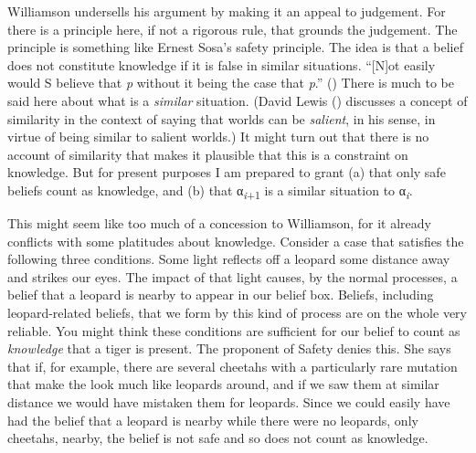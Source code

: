 \documentclass[
  10pt,
  letterpaper,
  DIV=11,
  numbers=noendperiod,
  twoside]{scrartcl}
\begin{document}
Williamson undersells his argument by making it an appeal to judgement.
For there is a principle here, if not a rigorous rule, that grounds the
judgement. The principle is something like Ernest Sosa's safety
principle. The idea is that a belief does not constitute knowledge if it
is false in similar situations. ``{[}N{]}ot easily would S believe that
\emph{p} without it being the case that \emph{p}.''
() There is much to be said here
about what is a \emph{similar} situation. (David Lewis
() discusses a concept of similarity in
the context of saying that worlds can be \emph{salient}, in his sense,
in virtue of being similar to salient worlds.) It might turn out that
there is no account of similarity that makes it plausible that this is a
constraint on knowledge. But for present purposes I am prepared to grant
(a) that only safe beliefs count as knowledge, and (b) that
α\textsubscript{\emph{i}+1} is a similar situation to
α\textsubscript{\emph{i}}.

This might seem like too much of a concession to Williamson, for it
already conflicts with some platitudes about knowledge. Consider a case
that satisfies the following three conditions. Some light reflects off a
leopard some distance away and strikes our eyes. The impact of that
light causes, by the normal processes, a belief that a leopard is nearby
to appear in our belief box. Beliefs, including leopard-related beliefs,
that we form by this kind of process are on the whole very reliable. You
might think these conditions are sufficient for our belief to count as
\emph{knowledge} that a tiger is present. The proponent of Safety denies
this. She says that if, for example, there are several cheetahs with a
particularly rare mutation that make the look much like leopards around,
and if we saw them at similar distance we would have mistaken them for
leopards. Since we could easily have had the belief that a leopard is
nearby while there were no leopards, only cheetahs, nearby, the belief
is not safe and so does not count as knowledge.
\end{document}
